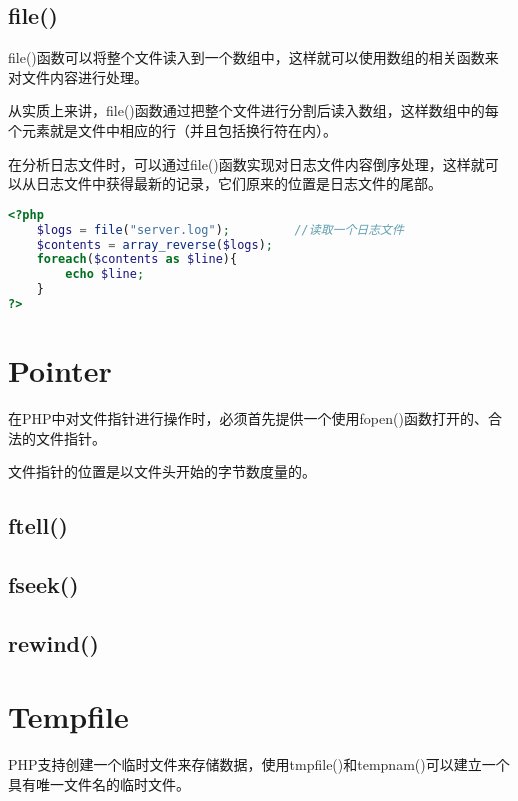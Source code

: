 \subsection{file()}



file()函数可以将整个文件读入到一个数组中，这样就可以使用数组的相关函数来对文件内容进行处理。

从实质上来讲，file()函数通过把整个文件进行分割后读入数组，这样数组中的每个元素就是文件中相应的行（并且包括换行符在内）。

在分析日志文件时，可以通过file()函数实现对日志文件内容倒序处理，这样就可以从日志文件中获得最新的记录，它们原来的位置是日志文件的尾部。

\begin{lstlisting}[language=PHP]
<?php
	$logs = file("server.log");			//读取一个日志文件
	$contents = array_reverse($logs);
	foreach($contents as $line){
		echo $line;
	}
?>
\end{lstlisting}




\section{Pointer}



在PHP中对文件指针进行操作时，必须首先提供一个使用fopen()函数打开的、合法的文件指针。


文件指针的位置是以文件头开始的字节数度量的。

\subsection{ftell()}



\subsection{fseek()}


\subsection{rewind()}


\section{Tempfile}


PHP支持创建一个临时文件来存储数据，使用tmpfile()和tempnam()可以建立一个具有唯一文件名的临时文件。

